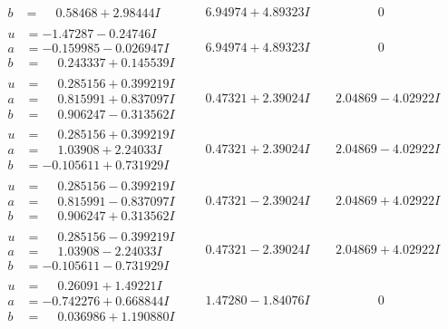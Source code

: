 \documentclass[1p]{elsarticle_modified}
\theoremstyle{definition}
\begin{document}
$$\begin{array}{c|c|c}
\begin{aligned}
b &= \phantom{-}0.58468 + 2.98444 I\end{aligned}
 & \phantom{-}6.94974 + 4.89323 I & \phantom{-0.000000 } 0 \\ \hline\begin{aligned}
u &= -1.47287 - 0.24746 I \\
a &= -0.159985 - 0.026947 I \\
b &= \phantom{-}0.243337 + 0.145539 I\end{aligned}
 & \phantom{-}6.94974 + 4.89323 I & \phantom{-0.000000 } 0 \\ \hline\begin{aligned}
u &= \phantom{-}0.285156 + 0.399219 I \\
a &= \phantom{-}0.815991 + 0.837097 I \\
b &= \phantom{-}0.906247 - 0.313562 I\end{aligned}
 & \phantom{-}0.47321 + 2.39024 I & \phantom{-}2.04869 - 4.02922 I \\ \hline\begin{aligned}
u &= \phantom{-}0.285156 + 0.399219 I \\
a &= \phantom{-}1.03908 + 2.24033 I \\
b &= -0.105611 + 0.731929 I\end{aligned}
 & \phantom{-}0.47321 + 2.39024 I & \phantom{-}2.04869 - 4.02922 I \\ \hline\begin{aligned}
u &= \phantom{-}0.285156 - 0.399219 I \\
a &= \phantom{-}0.815991 - 0.837097 I \\
b &= \phantom{-}0.906247 + 0.313562 I\end{aligned}
 & \phantom{-}0.47321 - 2.39024 I & \phantom{-}2.04869 + 4.02922 I \\ \hline\begin{aligned}
u &= \phantom{-}0.285156 - 0.399219 I \\
a &= \phantom{-}1.03908 - 2.24033 I \\
b &= -0.105611 - 0.731929 I\end{aligned}
 & \phantom{-}0.47321 - 2.39024 I & \phantom{-}2.04869 + 4.02922 I \\ \hline\begin{aligned}
u &= \phantom{-}0.26091 + 1.49221 I \\
a &= -0.742276 + 0.668844 I \\
b &= \phantom{-}0.036986 + 1.190880 I\end{aligned}
 & \phantom{-}1.47280 - 1.84076 I & \phantom{-0.000000 } 0 \\ \hline\begin{aligned}

\end{aligned}
\end{array}$$
\end{document}
